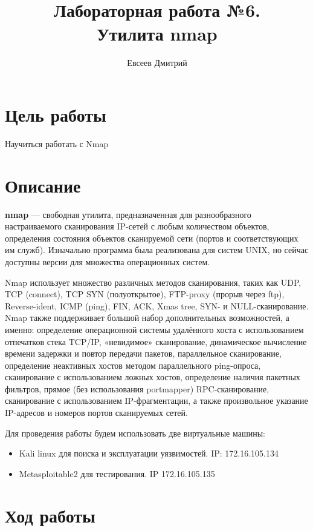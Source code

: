 \documentclass[10pt,a4paper]{report}
\author{Евсеев Дмитрий}
\title{Лабораторная работа №6.\\
	Утилита nmap}
\begin{document}
\maketitle
\tableofcontents
\pagebreak

\section{Цель работы}

Научиться работать с Nmap

\section{Описание}

\textbf{nmap} — свободная утилита, предназначенная для разнообразного настраиваемого сканирования IP-сетей с любым количеством объектов, определения состояния объектов сканируемой сети (портов и соответствующих им служб). Изначально программа была реализована для систем UNIX, но сейчас доступны версии для множества операционных систем.

Nmap использует множество различных методов сканирования, таких как UDP, TCP (connect), TCP SYN (полуоткрытое), FTP-proxy (прорыв через ftp), Reverse-ident, ICMP (ping), FIN, ACK, Xmas tree, SYN- и NULL-сканирование. Nmap также поддерживает большой набор дополнительных возможностей, а именно: определение операционной системы удалённого хоста с использованием отпечатков стека TCP/IP, «невидимое» сканирование, динамическое вычисление времени задержки и повтор передачи пакетов, параллельное сканирование, определение неактивных хостов методом параллельного ping-опроса, сканирование с использованием ложных хостов, определение наличия пакетных фильтров, прямое (без использования portmapper) RPC-сканирование, сканирование с использованием IP-фрагментации, а также произвольное указание IP-адресов и номеров портов сканируемых сетей.

Для проведения работы будем использовать две виртуальные машины:

\begin{itemize}
	\item Kali linux для поиска и эксплуатации уязвимостей. IP: 172.16.105.134
	\item Metasploitable2 для тестирования. IP 172.16.105.135
\end{itemize}

\section{Ход работы}
\end{document}
